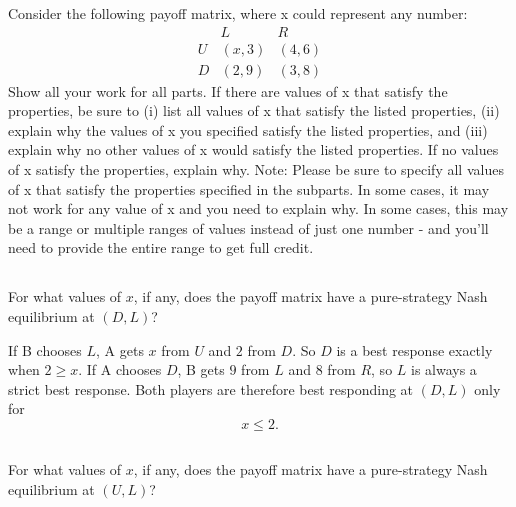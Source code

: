 \documentclass[newpages]{assignment}
\begin{document}
\begin{problem}
    Consider the following payoff matrix, where x could represent any number:
    \[
        \begin{array}{c|cc}
              & L      & R      \\
            \hline
            U & (x, 3) & (4, 6) \\
            D & (2, 9) & (3, 8)
        \end{array}
    \]
    Show all your work for all parts. If there are values of x that satisfy the properties, be sure to (i) list all values of x that satisfy the listed properties, (ii) explain why the values of x you specified satisfy the listed properties, and (iii) explain why no other values of x would satisfy the listed properties. If no values of x satisfy the properties, explain why. Note: Please be sure to specify all values of x that satisfy the properties specified in the subparts. In some cases, it may not work for any value of x and you need to explain why. In some cases, this may be a range or multiple ranges of values instead of just one number - and you'll need to provide the entire range to get full credit.
\end{problem}

\subsection{}

\begin{problem}
    For what values of \(x\), if any, does the payoff matrix have a pure-strategy
    Nash equilibrium at \((D, L)\)?
\end{problem}

\begin{solution}
    If B chooses \(L\), A gets \(x\) from \(U\) and \(2\) from \(D\).
    So \(D\) is a best response exactly when \(2\geq x\). If A chooses
    \(D\), B gets \(9\) from \(L\) and \(8\) from \(R\), so \(L\) is
    always a strict best response. Both players are therefore best
    responding at \((D,L)\) only for
    \[
        \boxed{x\leq 2}.
    \]
\end{solution}

\subsection{}

\begin{problem}
    For what values of \(x\), if any, does the payoff matrix have a pure-strategy
    Nash equilibrium at \((U, L)\)?
\end{problem}
\end{document}
